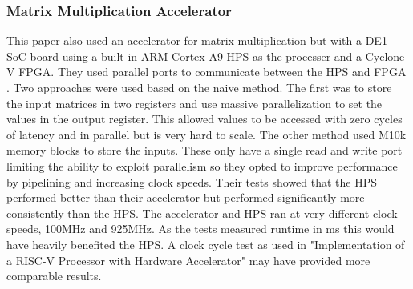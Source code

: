 \subsubsection{Matrix Multiplication Accelerator \citep{matrix_mult_accel}}
This paper also used an accelerator for matrix multiplication but with a DE1-SoC board using a built-in ARM Cortex-A9 HPS as the processer and a Cyclone V FPGA. They used parallel ports to communicate between the HPS and FPGA \cite{pio}. Two approaches were used based on the naive method. The first was to store the input matrices in two registers and use massive parallelization to set the values in the output register. This allowed values to be accessed with zero cycles of latency and in parallel but is very hard to scale. The other method used M10k memory blocks to store the inputs. These only have a single read and write port limiting the ability to exploit parallelism so they opted to improve performance by pipelining and increasing clock speeds. Their tests showed that the HPS performed better than their accelerator but performed significantly more consistently than the HPS. The accelerator and HPS ran at very different clock speeds, 100MHz and 925MHz. As the tests measured runtime in ms this would have heavily benefited the HPS. A clock cycle test as used in "Implementation of a RISC-V Processor with Hardware Accelerator" may have provided more comparable results.